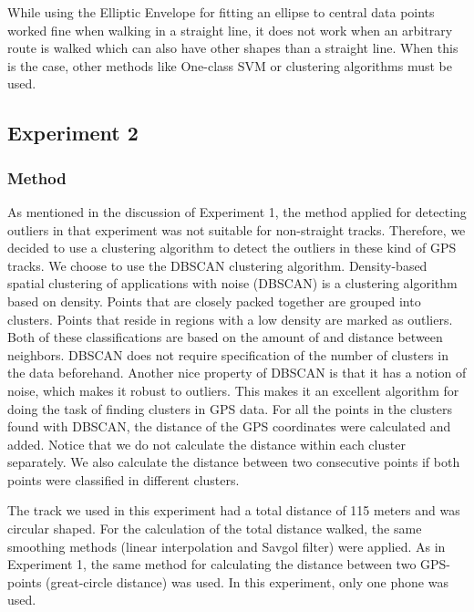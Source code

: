 While using the Elliptic Envelope for fitting an ellipse to central data points worked fine when walking in a straight line, it does not work when an arbitrary route is walked which can also have other shapes than a straight line. 
When this is the case, other methods like One-class SVM \cite{oneclasssvm} or clustering algorithms must be used.

\subsection{Experiment 2} \label{Experiment 2}
\subsubsection{Method}
As mentioned in the discussion of Experiment 1, the method applied for detecting outliers in that experiment was not suitable for non-straight tracks. 
Therefore, we decided to use a clustering algorithm to detect the outliers in these kind of GPS tracks.
We choose to use the DBSCAN clustering algorithm.
Density-based spatial clustering of applications with noise (DBSCAN) is a clustering algorithm based on density.
Points that are closely packed together are grouped into clusters.
Points that reside in regions with a low density are marked as outliers.
Both of these classifications are based on the amount of and distance between neighbors.
DBSCAN does not require specification of the number of clusters in the data beforehand.
Another nice property of DBSCAN is that it has a notion of noise, which makes it robust to outliers.
This makes it an excellent algorithm for doing the task of finding clusters in GPS data.
For all the points in the clusters found with DBSCAN, the distance of the GPS coordinates were calculated and added.
Notice that we do not calculate the distance within each cluster separately.
We also calculate the distance between two consecutive points if both points were classified in different clusters.

The track we used in this experiment had a total distance of 115 meters and was circular shaped.
For the calculation of the total distance walked, the same smoothing methods (linear interpolation and Savgol filter) were applied.
As in Experiment 1, the same method for calculating the distance between two GPS-points (great-circle distance) was used.
In this experiment, only one phone was used. 

